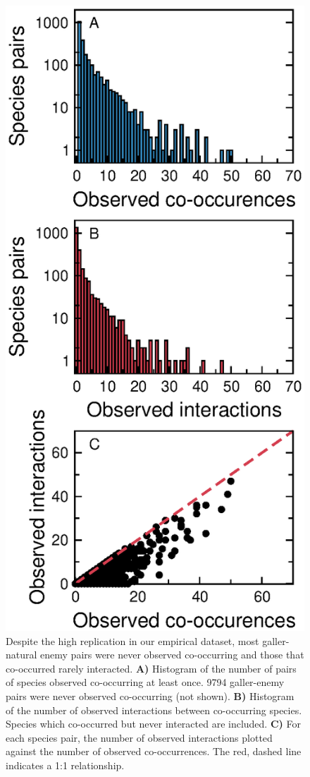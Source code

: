 \documentclass[12pt]{article}
\begin{document}
  \begin{figure}[h!]
      \caption{Despite the high replication in our empirical dataset, most galler-natural enemy pairs were never observed co-occurring and those that co-occurred rarely interacted. \textbf{A)} Histogram of the number of pairs of species observed co-occurring at least once. 9794 galler-enemy pairs were never observed co-occurring (not shown).
      \textbf{B)} Histogram of the number of observed interactions between co-occurring species. Species which co-occurred but never interacted are included. 
      \textbf{C)} For each species pair, the number of observed interactions plotted against the number of observed co-occurrences. The red, dashed line indicates a 1:1 relationship.}
      \label{histograms}
      \begin{center}
      \includegraphics*[height=.6\textheight]{figures/GP_histogram.eps}

\end{center}
\end{figure}
\end{document}
